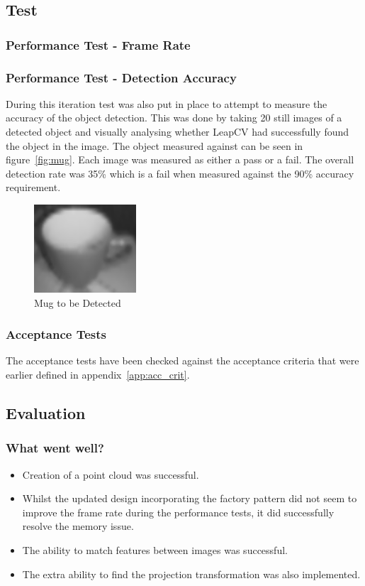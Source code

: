 \documentclass[11pt,oneside]{report}
\begin{document}
		\subsection{Test}
			\subsubsection{Performance Test - Frame Rate}
			
			
			
			\subsubsection{Performance Test - Detection Accuracy}
			
			
			During this iteration test was also put in place to attempt to measure the accuracy of the object detection. 
			This was done by taking 20 still images of a detected object and visually analysing whether LeapCV had successfully found the object in the image.
			The object measured against can be seen in figure~\ref{fig:mug}.
			Each image was measured as either a pass or a fail.
			The overall detection rate was 35\% which is a fail when measured against the 90\% accuracy requirement.
			\begin{figure}
			\centering
    				\includegraphics{mug}
    			\caption{Mug to be Detected \protect {\label{fig:mug}}}
			\end{figure}
			
			\subsubsection{Acceptance Tests}
			The acceptance tests have been checked against the acceptance criteria that were earlier defined in appendix~\ref{app:acc_crit}.
			
		\subsection{Evaluation}
			\subsubsection{What went well?}
			\begin{itemize}
				\item Creation of a point cloud was successful.
				\item Whilst the updated design incorporating the factory pattern did not seem to improve the frame rate during the performance tests, it did successfully resolve the memory issue. 
				\item The ability to match features between images was successful.
				\item The extra ability to find the projection transformation was also implemented.
			\end{itemize}
\end{document}
